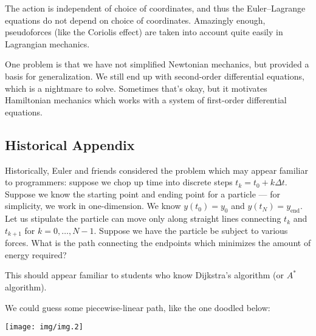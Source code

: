 The action is independent of choice of coordinates, and thus the
Euler--Lagrange equations do not depend on choice of coordinates.
Amazingly enough, pseudoforces (like the Coriolis effect) are taken into
account quite easily in Lagrangian mechanics.

One problem is that we have not simplified Newtonian mechanics, but
provided a basis for generalization. We still end up with second-order
differential equations, which is a nightmare to solve. Sometimes that's
okay, but it motivates Hamiltonian mechanics which works with a system
of first-order differential equations.

\subsection{Historical Appendix}

\M
Historically, Euler and friends considered the problem which may appear
familiar to programmers: suppose we chop up time into discrete steps
$t_{k} = t_{0} + k\Delta t$. Suppose we know the starting point
and ending point for a particle --- for simplicity, we work in
one-dimension. We know $y(t_{0}) = y_{0}$ and $y(t_{N}) = y_{\text{end}}$.
Let us stipulate the particle can move only along straight lines
connecting $t_{k}$ and $t_{k+1}$ for $k=0,\dots,N-1$. Suppose we have
the particle be subject to various forces. What is the path connecting
the endpoints which minimizes the amount of energy required?

This should appear familiar to students who know Dijkstra's algorithm
(or $A^{*}$ algorithm).

We could guess some piecewise-linear path, like the one doodled below:

\begin{center}
  \texttt{[image: img/img.2]}
\end{center}

